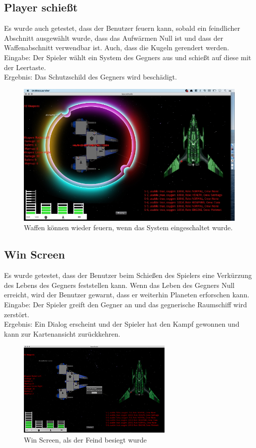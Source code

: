 \documentclass[12pt]{article}
\begin{document}
\subsection{Player schießt}
Es wurde auch getestet, dass der Benutzer feuern kann, sobald ein feindlicher Abschnitt ausgewählt wurde, dass das Aufwärmen Null ist und dass der Waffenabschnitt verwendbar ist. Auch, dass die Kugeln gerendert werden.\\
Eingabe: Der Spieler wählt ein System des Gegners aus und schießt auf diese mit der Leertaste.\\
Ergebnis: Das Schutzschild des Gegners wird beschädigt.\\
\begin{figure}[htp]
\centering
\includegraphics[scale=0.7]{TestProtocolBilder/OptimizedweaponsShot.png}
\caption{Waffen können wieder feuern, wenn das System eingeschaltet wurde.}
\end{figure}

\newpage
\subsection{Win Screen}
Es wurde getestet, dass der Benutzer beim Schießen des Spielers eine Verkürzung des Lebens des Gegners feststellen kann. Wenn das Leben des Gegners Null erreicht, wird der Benutzer gewarnt, dass er weiterhin Planeten erforschen kann.\\
Eingabe: Der Spieler greift den Gegner an und das gegnerische Raumschiff wird zerstört.\\
Ergebnis: Ein Dialog erscheint und der Spieler hat den Kampf gewonnen und kann zur Kartenansicht zurückkehren.\\
\begin{figure}[htp]
\centering
\includegraphics[scale=1.2]{TestProtocolBilder/wonScreen.jpg}
\caption{Win Screen, als der Feind besiegt wurde }
\end{figure}
\newpage
\end{document}
